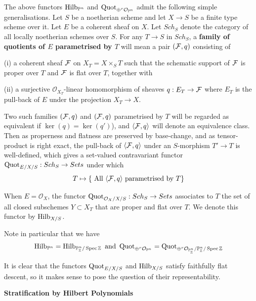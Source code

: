 \begin{definition}\label{nhq-relative-quot-family}
The above functors $\operatorname{Hilb}_{\mathbb{P}^n}$ and $\operatorname{Quot}_{\oplus^r {\mathcal O}_{\mathbb{P}^n}}$
admit the following simple generalisations.
Let $S$ be a noetherian scheme and let $X\to S$ be a finite type
scheme over it. Let $E$ be a coherent sheaf on $X$.
Let $Sch_S$ denote the category of all locally noetherian schemes
over $S$. For any $T\to S$ in $Sch_S$, a \textbf{family of quotients of $E$
parametrised by $T$} will mean
a pair $(\mathcal{F},q)$ consisting of

(i) a coherent sheaf $\mathcal{F}$ on $X_T = X\times_ST$
such that the schematic support of $\mathcal{F}$ is proper over $T$
and $\mathcal{F}$ is flat over $T$, together with

(ii) a surjective ${\mathcal O}_{X_T}$-linear homomorphism of sheaves
$q:E_T  \to \mathcal{F}$ where $E_T$ is the pull-back of $E$ under
the projection $X_T \to X$.

Two such families $(\mathcal{F},q)$ and $(\mathcal{F},q)$ parametrised by $T$ will
be regarded as equivalent if $\ker(q) = \ker(q')$),
and $\langle \mathcal{F}, q \rangle$ will denote
an equivalence class. Then as properness and flatness are preserved
by base-change, and as tensor-product is right exact,
the pull-back of $\langle \mathcal{F}, q \rangle$ under an $S$-morphism $T'\to T$ is
well-defined, which gives
a set-valued contravariant functor
$\operatorname{Quot}_{E/X/S} : Sch_S \to Sets$ under which
$$T\mapsto  \{\mbox{ All } \langle \mathcal{F}, q \rangle \mbox{ parametrised by }T\}$$

When $E = {\mathcal O}_X$, the functor $\operatorname{Quot}_{{\mathcal O}_X/X/S} : Sch_S \to Sets$
associates to $T$ the set of all closed subschemes $Y\subset X_T$
that are proper and flat over $T$. We denote this functor by $\operatorname{Hilb}_{X/S}$.

Note in particular that we have
$$\operatorname{Hilb}_{\mathbb{P}^n} = \operatorname{Hilb}_{\mathbb{P}^n_{\mathbb{Z}}/\operatorname{Spec} \mathbb{Z}} \mbox{ and }
\operatorname{Quot}_{\oplus^r {\mathcal O}_{\mathbb{P}^n}} =
\operatorname{Quot}_{\oplus^r {\mathcal O}_{\mathbb{P}^n_{\mathbb{Z}}}/\mathbb{P}^n_{\mathbb{Z}}/\operatorname{Spec} \mathbb{Z}}$$


It is clear that the functors $\operatorname{Quot}_{E/X/S}$ and $\operatorname{Hilb}_{X/S}$
satisfy faithfully flat descent,
so it makes sense to pose the question of their
representability.
\end{definition}



\medskip


\bigskip

\centerline{\large\bf Stratification by Hilbert Polynomials}


